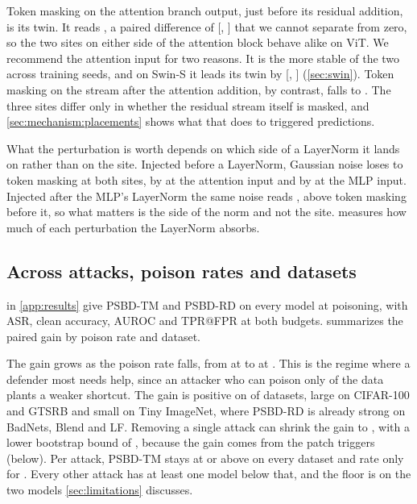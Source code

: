 Token masking on the attention branch output, just before its residual addition, is its twin. It reads \StaircaseOperatorsBeforeAttentionResidualTokenMaskAuroc{}, a paired difference of \StaircaseOperatorsBeforeAttentionResidualTokenMaskGain{} [\StaircaseOperatorsBeforeAttentionResidualTokenMaskGainLow{}, \StaircaseOperatorsBeforeAttentionResidualTokenMaskGainHigh{}] that we cannot separate from zero, so the two sites on either side of the attention block behave alike on ViT. We recommend the attention input for two reasons. It is the more stable of the two across training seeds, and on Swin-S it leads its twin by \SwinGainRecommendedMinusTwin{} [\SwinGainRecommendedMinusTwinLow{}, \SwinGainRecommendedMinusTwinHigh{}] (\cref{sec:swin}). Token masking on the stream after the attention addition, by contrast, falls to \StaircaseOperatorsAfterAttentionResidualTokenMaskAuroc{}. The three sites differ only in whether the residual stream itself is masked, and \cref{sec:mechanism:placements} shows what that does to triggered predictions.

What the perturbation is worth depends on which side of a LayerNorm it lands on rather than on the site. Injected before a LayerNorm, Gaussian noise loses to token masking at both sites, by \StaircaseOperatorsBeforeAttentionNormGaussianGain{} at the attention input and by \StaircaseOperatorsBeforeMlpNormGaussianGain{} at the MLP input. Injected after the MLP's LayerNorm the same noise reads \StaircaseOperatorsBeforeMlpGaussianAuroc{}, above token masking before it, so what matters is the side of the norm and not the site.  measures how much of each perturbation the LayerNorm absorbs.

\subsection{Across attacks, poison rates and datasets}
\label{sec:results:headline}

 in \cref{app:results} give PSBD-TM and PSBD-RD on every model at \PanelRates{} poisoning, with ASR, clean accuracy, AUROC and TPR@FPR at both budgets.  summarizes the paired gain by poison rate and dataset.



The gain grows as the poison rate falls, from \GainsHighestRate{} at \PanelRateHigh{} to \GainsLowestRate{} at \PanelRateLow{}. This is the regime where a defender most needs help, since an attacker who can poison only \PanelRateLow{} of the data plants a weaker shortcut. The gain is positive on \GainsPositiveDatasets{} of \GainsDatasets{} datasets, large on CIFAR-100 and GTSRB and small on Tiny ImageNet, where PSBD-RD is already strong on BadNets, Blend and LF. Removing a single attack can shrink the gain to \GainsLeaveOneAttackOut{}, with a lower bootstrap bound of \GainsLeaveOneAttackOutLow{}, because the gain comes from the patch triggers (below). Per attack, PSBD-TM stays at or above \GainsStrongAuroc{} on every dataset and rate only for \GainsStrongAttacks{}. Every other attack has at least one model below that, and the floor is \HeadlineFloorAuroc{} on the two models \cref{sec:limitations} discusses.

